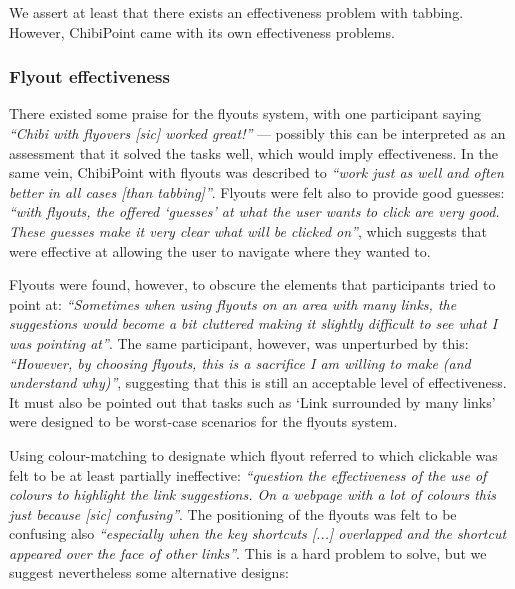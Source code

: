 \documentclass[a4paper, 12pt]{report}
\begin{document}
We assert at least that there exists an effectiveness problem with tabbing. However, ChibiPoint came with its own effectiveness problems.

\subsubsection{Flyout effectiveness}
\label{sec:flyout_effectiveness}
There existed some praise for the flyouts system, with one participant saying \textit{``Chibi with flyovers [sic] worked great!''} --- possibly this can be interpreted as an assessment that it solved the tasks well, which would imply effectiveness. In the same vein, ChibiPoint with flyouts was described to \textit{``work just as well and often better in all cases [than tabbing]''}. Flyouts were felt also to provide good guesses: \textit{``with flyouts, the offered `guesses' at what the user wants to click are very good. These guesses make it very clear what will be clicked on''}, which suggests that were effective at allowing the user to navigate where they wanted to.

Flyouts were found, however, to obscure the elements that participants tried to point at: \textit{``Sometimes when using flyouts on an area with many links, the suggestions would become a bit cluttered making it slightly difficult to see what I was pointing at''}. The same participant, however, was unperturbed by this: \textit{``However, by choosing flyouts, this is a sacrifice I am willing to make (and understand why)''}, suggesting that this is still an acceptable level of effectiveness. It must also be pointed out that tasks such as `Link surrounded by many links' were designed to be worst-case scenarios for the flyouts system.

Using colour-matching to designate which flyout referred to which clickable was felt to be at least partially ineffective: \textit{``question the effectiveness of the use of colours to highlight the link suggestions. On a webpage with a lot of colours this just because [sic] confusing''}. The positioning of the flyouts was felt to be confusing also \textit{``especially when the key shortcuts [...] overlapped and the shortcut appeared over the face of other links''}. This is a hard problem to solve, but we suggest nevertheless some alternative designs:
\end{document}

